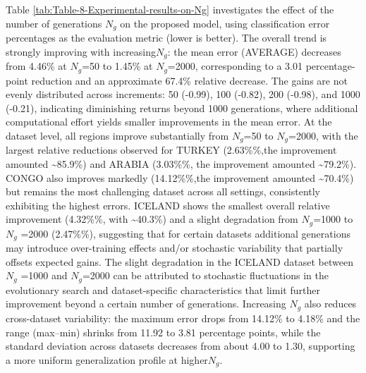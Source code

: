 \documentclass[12pt]{Definitions/academia}
\begin{document}
Table \ref{tab:Table-8-Experimental-results-on-Ng} investigates the effect
of the number of generations $N_{g}$ on the proposed model, using
classification error percentages as the evaluation metric (lower is
better). The overall trend is strongly improving with increasing$N_{g}$:
the mean error (AVERAGE) decreases from 4.46\% at $N_{g}$=50 to 1.45\%
at $N_{g}$=2000, corresponding to a 3.01 percentage-point reduction
and an approximate 67.4\% relative decrease. The gains are not evenly
distributed across increments: 50 (-0.99), 100
(-0.82), 200 (-0.98), and 1000
(-0.21), indicating diminishing returns beyond 1000 generations, where
additional computational effort yields smaller improvements in the
mean error. At the dataset level, all regions improve substantially
from $N_{g}$=50 to $N_{g}$=2000, with the largest relative reductions
observed for TURKEY (2.63\%\%,the improvement amounted \textasciitilde 85.9\%)
and ARABIA (3.03\%\%, the improvement amounted \textasciitilde 79.2\%).
CONGO also improves markedly (14.12\%\%,the improvement amounted \textasciitilde 70.4\%)
but remains the most challenging dataset across all settings, consistently
exhibiting the highest errors. ICELAND shows the smallest overall
relative improvement (4.32\%\%, with \textasciitilde 40.3\%)
and a slight degradation from $N_{g}$=1000 to$N_{g}$ =2000 (2.47\%\%),
suggesting that for certain datasets additional generations may introduce
over-training effects and/or stochastic variability that partially
offsets expected gains. The slight degradation in the ICELAND dataset
between$N_{g}$ =1000 and $N_{g}$=2000 can be attributed to stochastic
fluctuations in the evolutionary search and dataset\nobreakdash-specific
characteristics that limit further improvement beyond a certain number
of generations. Increasing $N_{g}$ also reduces cross-dataset variability:
the maximum error drops from 14.12\% to 4.18\% and the range (max--min)
shrinks from 11.92 to 3.81 percentage points, while the standard deviation
across datasets decreases from about 4.00 to 1.30, supporting a more
uniform generalization profile at higher$N_{g}$.
\end{document}
